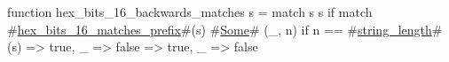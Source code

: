 function hex_bits_16_backwards_matches s = match s {
  s if match #\hyperref[sailRISCVzhexzybitszy16zymatcheszyprefix]{hex\_bits\_16\_matches\_prefix}#(s) {
    #\hyperref[sailRISCVzSome]{Some}# (_, n) if n == #\hyperref[sailRISCVzstringzylength]{string\_length}#(s) => true,
    _ => false
  } => true,
  _ => false
}
